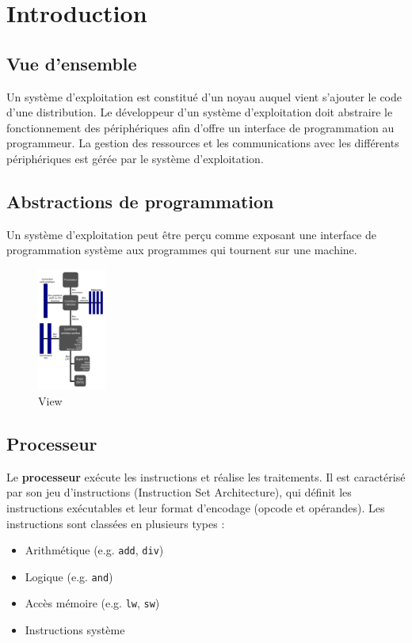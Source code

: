 \section{Introduction}\label{sec:introduction}
\subsection{Vue d'ensemble}

Un système d'exploitation est constitué d'un noyau auquel vient s'ajouter le code d'une distribution.
Le développeur d'un système d'exploitation doit abstraire le fonctionnement des périphériques afin d'offre un interface de programmation au programmeur.
La gestion des ressources et les communications avec les différents périphériques est gérée par le système d'exploitation.

\subsection{Abstractions de programmation}

Un système d’exploitation peut être perçu comme exposant une interface de programmation système aux programmes qui tournent sur une machine.

\begin{figure}[h!]
    \centering
    \includegraphics[width=0.2\textwidth]{Images/View/view.png}
    \caption{View}
    \label{fig:myimage}
  \end{figure}
  

\subsection{Processeur}


Le \textbf{processeur} exécute les instructions et réalise les traitements. 
Il est caractérisé par son jeu d'instructions (Instruction Set Architecture), qui définit les instructions exécutables et leur format d'encodage (opcode et opérandes). 
Les instructions sont classées en plusieurs types :
\begin{itemize}
    \item Arithmétique (e.g. \texttt{add}, \texttt{div})
    \item Logique (e.g. \texttt{and})
    \item Accès mémoire (e.g. \texttt{lw}, \texttt{sw})
    \item Instructions système
\end{itemize}

